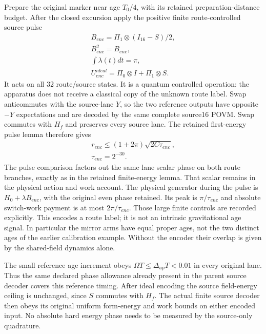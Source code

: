 Prepare the original marker near age \(T_0/4\), with its retained
preparation-distance budget. After the closed excursion apply the
positive finite route-controlled source pulse
\begin{equation}\begin{gathered}
B_{enc}=\Pi_1\otimes(I_{16}-S)/2,\\
 B_{enc}^2=B_{enc},\\
 \int\lambda(t)dt=\pi,\\
 U_{enc}^{ideal}=\Pi_0\otimes I+\Pi_1\otimes S.
 \label{eq:new-encoder}
\end{gathered}\end{equation}
It acts on all 32 route/source states. It is a quantum controlled
operation: the apparatus does not receive a classical copy of the unknown
route label. Swap anticommutes with the source-lane \(Y\), so the two
reference outputs have opposite \(-Y\) expectations and are decoded by
the same complete source16 POVM. Swap commutes with \(H_f\) and preserves
every source lane. The retained first-energy pulse lemma therefore gives
\[\begin{gathered}
r_{enc}\leq(1+2\pi)\sqrt{2C\tau_{enc}},\\
 \tau_{enc}=2^{-30}.
\end{gathered}\]
The pulse comparison factors out the same lane scalar phase on both route
branches, exactly as in the retained finite-energy lemma. That scalar
remains in the physical action and work account. The physical generator
during the pulse is \(H_0+\lambda B_{enc}\),
with the original even phase retained. Its peak is \(\pi/\tau_{enc}\)
and absolute switch-work payment is at most \(2\pi/\tau_{enc}\).
Those large finite controls are recorded explicitly. This encodes a
route label; it is not an intrinsic gravitational age signal. In
particular the mirror arms have equal proper ages, not the two distinct
ages of the earlier calibration example. Without the encoder their
overlap is given by the shared-field dynamics alone.

The small reference age increment obeys
\(\Omega T\leq\Delta_{up}T<0.01\) in every original lane. Thus the
same declared phase allowance already present in the parent source
decoder covers this reference timing. After ideal encoding the source
field-energy ceiling is unchanged, since \(S\) commutes with \(H_f\).
The actual finite source decoder then obeys its original uniform
form-energy and work bounds on either encoded input. No absolute hard
energy phase needs to be measured by the source-only quadrature.

